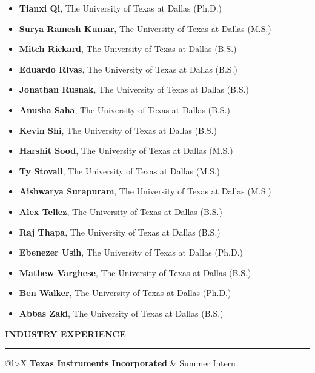 \documentclass[12pt]{article}
\begin{document}
\begin{itemize}[noitemsep]
\item \textbf{Tianxi Qi}, The University of Texas at Dallas (Ph.D.) 
\item \textbf{Surya Ramesh Kumar}, The University of Texas at Dallas (M.S.) 
\item \textbf{Mitch Rickard}, The University of Texas at Dallas (B.S.) 
\item \textbf{Eduardo Rivas}, The University of Texas at Dallas (B.S.) 
\item \textbf{Jonathan Rusnak}, The University of Texas at Dallas (B.S.) 
\item \textbf{Anusha Saha}, The University of Texas at Dallas (B.S.) 
\item \textbf{Kevin Shi}, The University of Texas at Dallas (B.S.) 
\item \textbf{Harshit Sood}, The University of Texas at Dallas (M.S.) 
\item \textbf{Ty Stovall}, The University of Texas at Dallas (M.S.)
\item \textbf{Aishwarya Surapuram}, The University of Texas at Dallas (M.S.) 
\item \textbf{Alex Tellez}, The University of Texas at Dallas (B.S.) 
\item \textbf{Raj Thapa}, The University of Texas at Dallas (B.S.) 
\item \textbf{Ebenezer Usih}, The University of Texas at Dallas (Ph.D.) 
\item \textbf{Mathew Varghese}, The University of Texas at Dallas (B.S.) 
\item \textbf{Ben Walker}, The University of Texas at Dallas (Ph.D.) 
\item \textbf{Abbas Zaki}, The University of Texas at Dallas (B.S.) 

\end{itemize}

\vspace{2em}

{\Large \textbf{INDUSTRY EXPERIENCE}}

\textcolor{gray}{\rule{\textwidth}{2pt}}

\begin{tabularx}{\linewidth}{{@{}l>{\raggedleft\arraybackslash}X}}
\textbf{Texas Instruments Incorporated} & Summer Intern
\end{tabularx}
\end{document}
